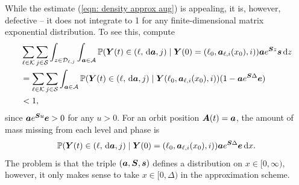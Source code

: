 While the estimate (\ref{eqn: density approx aug}) is appealing, it is, however, defective -- it does not integrate to 1 for any finite-dimensional matrix exponential distribution. To see this, compute 
\begin{align*}
	&\sum_{\ell\in\mathcal K}\sum_{j\in\mathcal S}\int_{z\in\mathcal D_{\ell,j}}\displaystyle\int_{\boldsymbol a \in\mathcal A}\mathbb P(\boldsymbol Y(t) \in (\ell, \, \mathrm{d} \boldsymbol a, j)\mid \boldsymbol Y(0)=(\ell_0, \boldsymbol  a_{\ell,i}(x_0), i)) \boldsymbol a e^{ \boldsymbol{S}z} \boldsymbol s \, \mathrm{d} z
	\\&= \sum_{\ell\in\mathcal K}\sum_{j\in\mathcal S}\displaystyle\int_{\boldsymbol a \in\mathcal A}\mathbb P(\boldsymbol Y(t) \in (\ell, \, \mathrm{d} \boldsymbol a, j)\mid \boldsymbol Y(\ell_0, \boldsymbol  a_{\ell,i}(x_0), i)) (1-\boldsymbol a e^{ \boldsymbol{S}\Delta}\boldsymbol e  )
	\\&<1,
\end{align*}
since \(\boldsymbol a e^{\boldsymbol{S}u} \boldsymbol e>0\) for any \(u>0\). For an orbit position \(\boldsymbol A(t)=\boldsymbol a\), the amount of mass missing from each level and phase is 
\[\mathbb P(\boldsymbol Y(t)\in (\ell, \, \mathrm{d} \boldsymbol a,j)\mid \boldsymbol Y(0)=(\ell_0,  \boldsymbol  a_{\ell,i}(x_0), i)) \boldsymbol a e^{\boldsymbol{S}\Delta} \boldsymbol e \, \mathrm{d} x.\]
The problem is that the triple \((\boldsymbol a,\boldsymbol S, \boldsymbol s)\) defines a distribution on \(x\in[0,\infty)\), however, it only makes sense to take \(x\in[0,\Delta)\) in the approximation scheme.

